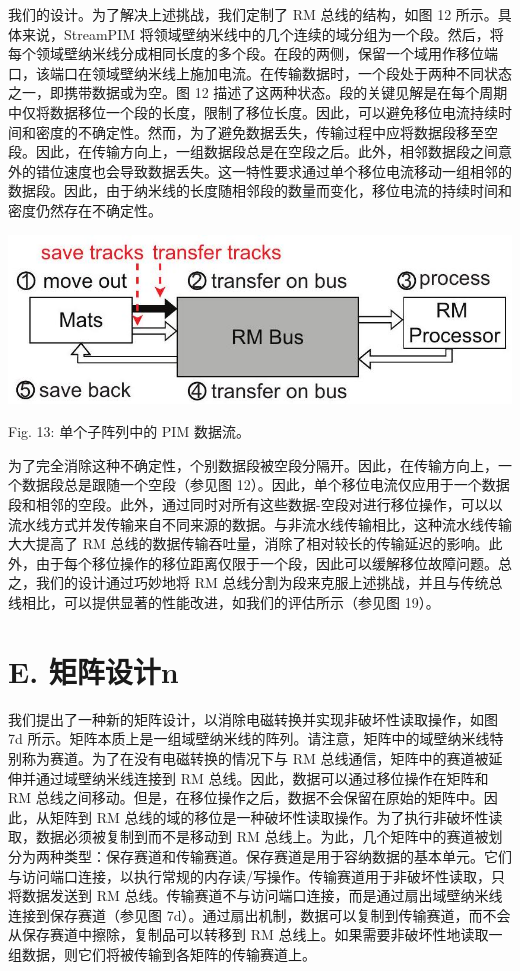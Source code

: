 \documentclass[10pt]{article}
\begin{document}
我们的设计。为了解决上述挑战，我们定制了 RM 总线的结构，如图 12 所示。具体来说，StreamPIM 将领域壁纳米线中的几个连续的域分组为一个段。然后，将每个领域壁纳米线分成相同长度的多个段。在段的两侧，保留一个域用作移位端口，该端口在领域壁纳米线上施加电流。在传输数据时，一个段处于两种不同状态之一，即携带数据或为空。图 12 描述了这两种状态。段的关键见解是在每个周期中仅将数据移位一个段的长度，限制了移位长度。因此，可以避免移位电流持续时间和密度的不确定性。然而，为了避免数据丢失，传输过程中应将数据段移至空段。因此，在传输方向上，一组数据段总是在空段之后。此外，相邻数据段之间意外的错位速度也会导致数据丢失。这一特性要求通过单个移位电流移动一组相邻的数据段。因此，由于纳米线的长度随相邻段的数量而变化，移位电流的持续时间和密度仍然存在不确定性。

\begin{center}
\includegraphics[max width=\textwidth]{2024_05_12_abeba8a85da5b5ec4c7bg-07}
\end{center}

Fig. 13: 单个子阵列中的 PIM 数据流。

为了完全消除这种不确定性，个别数据段被空段分隔开。因此，在传输方向上，一个数据段总是跟随一个空段（参见图 12）。因此，单个移位电流仅应用于一个数据段和相邻的空段。此外，通过同时对所有这些数据-空段对进行移位操作，可以以流水线方式并发传输来自不同来源的数据。与非流水线传输相比，这种流水线传输大大提高了 RM 总线的数据传输吞吐量，消除了相对较长的传输延迟的影响。此外，由于每个移位操作的移位距离仅限于一个段，因此可以缓解移位故障问题。总之，我们的设计通过巧妙地将 RM 总线分割为段来克服上述挑战，并且与传统总线相比，可以提供显著的性能改进，如我们的评估所示（参见图 19）。

\section*{E. 矩阵设计n}
我们提出了一种新的矩阵设计，以消除电磁转换并实现非破坏性读取操作，如图 7d 所示。矩阵本质上是一组域壁纳米线的阵列。请注意，矩阵中的域壁纳米线特别称为赛道。为了在没有电磁转换的情况下与 RM 总线通信，矩阵中的赛道被延伸并通过域壁纳米线连接到 RM 总线。因此，数据可以通过移位操作在矩阵和 RM 总线之间移动。但是，在移位操作之后，数据不会保留在原始的矩阵中。因此，从矩阵到 RM 总线的域的移位是一种破坏性读取操作。为了执行非破坏性读取，数据必须被复制到而不是移动到 RM 总线上。为此，几个矩阵中的赛道被划分为两种类型：保存赛道和传输赛道。保存赛道是用于容纳数据的基本单元。它们与访问端口连接，以执行常规的内存读/写操作。传输赛道用于非破坏性读取，只将数据发送到 RM 总线。传输赛道不与访问端口连接，而是通过扇出域壁纳米线连接到保存赛道（参见图 7d）。通过扇出机制，数据可以复制到传输赛道，而不会从保存赛道中擦除，复制品可以转移到 RM 总线上。如果需要非破坏性地读取一组数据，则它们将被传输到各矩阵的传输赛道上。
\end{document}
